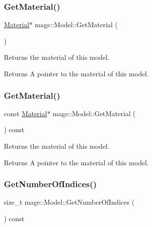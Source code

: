 \subsubsection{\texorpdfstring{Get\+Material()}{GetMaterial()}\hspace{0.1cm}{\footnotesize\ttfamily [1/2]}}
{\footnotesize\ttfamily \hyperlink{classmage_1_1_material}{Material}$\ast$ mage\+::\+Model\+::\+Get\+Material (\begin{DoxyParamCaption}{ }\end{DoxyParamCaption})\hspace{0.3cm}{\ttfamily [noexcept]}}

Returns the material of this model.

\begin{DoxyReturn}{Returns}
A pointer to the material of this model. 
\end{DoxyReturn}
\hypertarget{classmage_1_1_model_a10a9de6608365356b5b6ad2669ab39f8}{}\label{classmage_1_1_model_a10a9de6608365356b5b6ad2669ab39f8} 
\subsubsection{\texorpdfstring{Get\+Material()}{GetMaterial()}\hspace{0.1cm}{\footnotesize\ttfamily [2/2]}}
{\footnotesize\ttfamily const \hyperlink{classmage_1_1_material}{Material}$\ast$ mage\+::\+Model\+::\+Get\+Material (\begin{DoxyParamCaption}{ }\end{DoxyParamCaption}) const\hspace{0.3cm}{\ttfamily [noexcept]}}

Returns the material of this model.

\begin{DoxyReturn}{Returns}
A pointer to the material of this model. 
\end{DoxyReturn}
\hypertarget{classmage_1_1_model_a37c9814a445159fd742bcc1b9a5a7b94}{}\label{classmage_1_1_model_a37c9814a445159fd742bcc1b9a5a7b94} 
\subsubsection{\texorpdfstring{Get\+Number\+Of\+Indices()}{GetNumberOfIndices()}}
{\footnotesize\ttfamily size\+\_\+t mage\+::\+Model\+::\+Get\+Number\+Of\+Indices (\begin{DoxyParamCaption}{ }\end{DoxyParamCaption}) const\hspace{0.3cm}{\ttfamily [noexcept]}}

